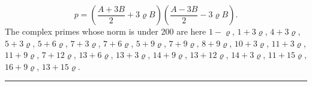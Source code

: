 \[
p = \left(\frac{A+3B}{2}+3\varrho B\right)\left(\frac{A-3B}{2}-3\varrho B\right)\!.
\]
The complex primes whose norm is under 200 are here $1-\varrho$, $1+3\varrho$, $4+3\varrho$, $5+3\varrho$, $5+6\varrho$, $7+3\varrho$, $7+6\varrho$, $5+9\varrho$, $7+9\varrho$, $8+9\varrho$, $10+3\varrho$, $11+3\varrho$, $11+9\varrho$, $7+12\varrho$, $13+6\varrho$, $13+3\varrho$, $14+9\varrho$, $13+12\varrho$, $14+3\varrho$, $11+15\varrho$, $16+9\varrho$, $13+15\varrho$.

\begin{center}
\rule{3cm}{0.4pt}
\end{center}
